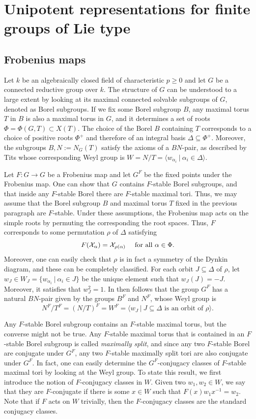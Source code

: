 \section{Unipotent representations for finite groups of Lie type}
\subsection{Frobenius maps}

Let $k$ be an algebraically closed field of characteristic $p\geq 0$ and let $G$ be a connected reductive group over $k$. The structure of $G$ can be understood to a large extent by looking at its maximal connected solvable subgroups of $G$, denoted as Borel subgroups. If we fix some Borel subgroup $B$, any maximal torus $T$ in $B$ is also a maximal torus in $G$, and it determines a set of roots $\Phi=\Phi(G,T)\subset X(T)$. The choice of the Borel $B$ containing $T$ corresponds to a choice of positive roots $\Phi^+$ and therefore of an integral basis $\Delta\subseteq\Phi^+$. Moreover, the subgroups $B,N:=N_G(T)$ satisfy the axioms of a $BN$-pair, as described by Tits whose corresponding Weyl group is $W=N/T=\langle w_{\alpha_i}\ |\ \alpha_i\in\Delta\rangle$.


Let $F:G\rightarrow G$ be a Frobenius map and let $G^F$ be the fixed points under the Frobenius map. One can show that $G$ contains $F$-stable Borel subgroups, and that inside any $F$-stable Borel there are $F$-stable maximal tori. Thus, we may assume that the Borel subgroup $B$ and maximal torus $T$ fixed in the previous paragraph are $F$-stable. Under these assumptions, the Frobenius map acts on the simple roots by permuting the corresponding the root spaces. Thus, $F$ corresponds to some permutation $\rho$ of $\Delta$ satisfying
$$F(\mathcal{X}_\alpha)=\mathcal{X}_{\rho(\alpha)}\quad\text{ for all }\alpha\in\Phi.$$
Moreover, one can easily check that $\rho$ is in fact a symmetry of the Dynkin diagram, and these can be completely classified. For each orbit $J\subseteq\Delta$ of $\rho$, let $w_J\in W_J=\{w_{\alpha_i}\ |\ \alpha_i\in J\}$ be the unique element such that $w_J(J)=-J$. Moreover, it satisfies that $w_J^2=1$. In then follows that the group $G^F$ has a natural $BN$-pair given by the groups $B^F$ and $N^F$, whose Weyl group is
$$N^F/T^F=(N/T)^F=W^F=\langle w_J\ |\ J\subseteq\Delta\text{ is an orbit of }\rho\rangle.$$

Any $F$-stable Borel subgroup contains an $F$-stable maximal torus, but the converse might not be true. Any $F$-stable maximal torus that is contained in an $F$-stable Borel subgroup is called \textit{maximally split}, and since any two $F$-stable Borel are conjugate under $G^F$, any two $F$-stable maximally split tori are also conjugate under $G^F$. In fact, one can easily determine the $G^F$-conjugacy classes of $F$-stable maximal tori by looking at the Weyl group. To state this result, we first introduce the notion of $F$-conjugacy classes in $W$. Given two $w_1,w_2\in W$, we say that they are $F$-conjugate if there is some $x\in W$ such that $F(x)w_1x^{-1}=w_2$. Note that if $F$ acts on $W$ trivially, then the $F$-conjugacy classes are the standard conjugacy classes.

